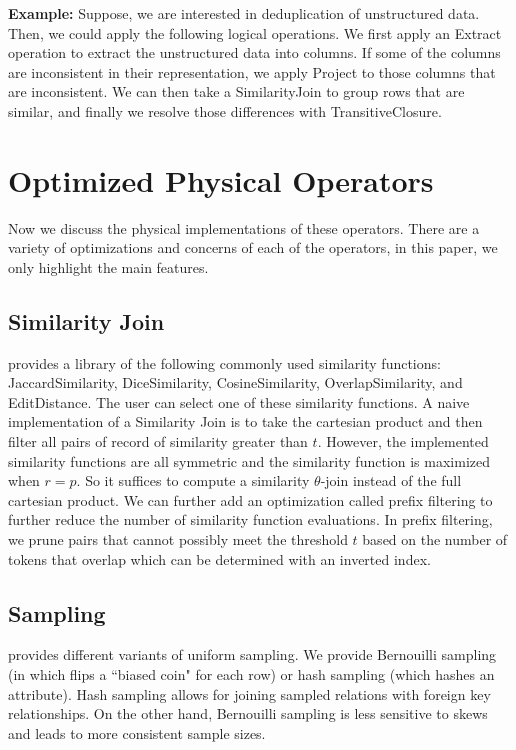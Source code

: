 \vspace{0.5em}
\noindent \textbf{Example: } Suppose, we are interested in deduplication of unstructured data. Then, we could apply the following logical operations.
We first apply an \textsf{Extract} operation to extract the unstructured data into columns. If some of the columns are inconsistent in their representation,
we apply \textsf{Project} to those columns that are inconsistent. We can then take a \textsf{SimilarityJoin} to group rows that are similar, and finally
we resolve those differences with \textsf{TransitiveClosure}.

\section{Optimized Physical Operators}
Now we discuss the physical implementations of these operators.
There are a variety of optimizations and concerns of each of the operators, in this paper, we 
only highlight the main features.

\subsection{Similarity Join} 
\projx provides a library of the following commonly used similarity functions: \textsf{JaccardSimilarity}, \textsf{DiceSimilarity},
\textsf{CosineSimilarity}, \textsf{OverlapSimilarity}, and \textsf{EditDistance}.
The user can select one of these similarity functions.
A naive implementation of a Similarity Join is to take the cartesian product and then filter all pairs of record of similarity greater than $t$.
However, the implemented similarity functions are all symmetric and the similarity function is maximized when $r = p$.
So it suffices to compute a similarity $\theta$-join instead of the full cartesian product.
We can further add an optimization called prefix filtering to further reduce the number of similarity function evaluations.
In prefix filtering, we prune pairs that cannot possibly meet the threshold $t$ based on the number of tokens that overlap which can be determined with an inverted index.

\subsection{Sampling}
\projx provides different variants of uniform sampling.
We provide Bernouilli sampling (in which flips a ``biased coin" for each row) or hash sampling (which hashes an attribute).
Hash sampling allows for joining sampled relations with foreign key relationships.
On the other hand, Bernouilli sampling is less sensitive to skews and leads to more consistent sample sizes.

